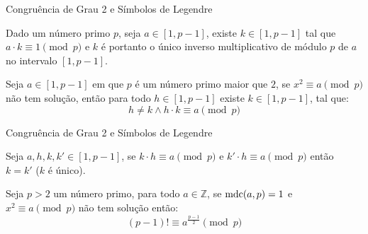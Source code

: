 \begin{frame}[fragile]{Congruência de Grau 2 e Símbolos de Legendre}

    \begin{lema} Dado um número primo $p$, seja 
        $a \in [1, p-1]$, existe $k \in [1, p-1]$ tal que $ a \cdot k \equiv 1 \pmod p$ e $k$ é portanto o único inverso multiplicativo de  módulo $p$ de $a$ no intervalo $[1, p-1]$. \label{lema : invmod}
    \end{lema}

    \begin{lema} 
    Seja $a \in [1, p-1]$ em que $p$ é um número primo maior que $2$, se $x^2 \equiv a \pmod p$ não tem solução, então para todo $h \in [1, p-1]$ existe $k \in [1, p-1]$, tal que: \label{lema : hkequivamodp}
        \begin{equation*} 
            h \neq k \land h \cdot k \equiv a \pmod p 
        \end{equation*}
    \end{lema}

\end{frame}

\begin{frame}[fragile]{Congruência de Grau 2 e Símbolos de Legendre}

    \begin{lema} \label{lema : kk'modp}
    Seja $a, h, k, k' \in [1, p-1]$, se $k \cdot h \equiv a \pmod{p}$ e $k' \cdot h \equiv a \pmod{p}$ então $k = k'$ ($k$ é único).
    \end{lema}

    \begin{lema} \label{lema : modp-1fat}
    Seja $p > 2$ um número primo, para todo $a \in \mathbb{Z}$, se $\operatorname{mdc}(a, p) = 1$ e $x^2 \equiv a \pmod p$ não tem solução então:
        \begin{equation*}
            (p - 1)! \equiv a^{\frac{p-1}{2}} \pmod{p}
        \end{equation*}
    \end{lema}
        
\end{frame}

